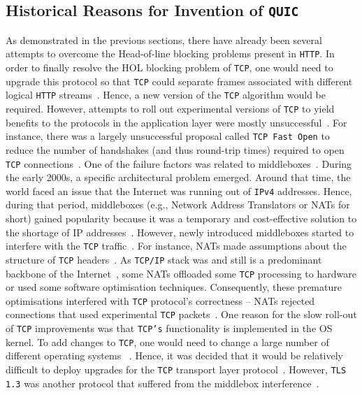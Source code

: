 \documentclass[12pt,a4paper]{report}
\begin{document}
\subsection{Historical Reasons for Invention of \texttt{QUIC}}
As demonstrated in the previous sections, there have already been several attempts to overcome the Head-of-line blocking problems present in \texttt{HTTP}.
In order to finally resolve the HOL blocking problem of \texttt{TCP}, one would need to upgrade this protocol so that \texttt{TCP} could separate frames associated with different logical \texttt{HTTP} streams~\cite{head-of-line-blocking-in-quic-and-http-3-the-details}.
Hence, a new version of the \texttt{TCP} algorithm would be required. 
However, attempts to roll out experimental versions of \texttt{TCP} to yield benefits to the protocols in the application layer were mostly unsuccessful~\cite{bib_Netdev_0x13_QUIC_Tutorial, PollardBarry2019HiAP}.
For instance, there was a largely unsuccessful proposal called \texttt{TCP Fast Open} to reduce the number of handshakes (and thus round-trip times) required to open \texttt{TCP} connections~\cite{the-sad-story-of-tcp-fast-open}.
One of the failure factors was related to middleboxes~\cite{the-sad-story-of-tcp-fast-open}.
During the early 2000s, a specific architectural problem emerged.
Around that time, the world faced an issue that the Internet was running out of \texttt{IPv4} addresses.
Hence, during that period, middleboxes (e.g., Network Address Translators or NATs for short) gained popularity because it was a temporary and cost-effective solution to the shortage of IP addresses~\cite{MurphyNiallRichard2005Ina, bib_Netdev_0x13_QUIC_Tutorial}.
However, newly introduced middleboxes started to interfere with the \texttt{TCP} traffic~\cite{bib_Netdev_0x13_QUIC_Tutorial, PollardBarry2019HiAP}.
For instance, NATs made assumptions about the structure of \texttt{TCP} headers~\cite{bib_Netdev_0x13_QUIC_Tutorial, PollardBarry2019HiAP}.
As \texttt{TCP/IP} stack was and still is a predominant backbone of the Internet~\cite{tcp-ip-stack_shtml}, some NATs offloaded some \texttt{TCP} processing to hardware or used some software optimisation techniques.
Consequently, these premature optimisations interfered with \texttt{TCP} protocol's correctness -- NATs rejected connections that used experimental \texttt{TCP} packets~\cite{PollardBarry2019HiAP}.
One reason for the slow roll-out of \texttt{TCP} improvements was that \texttt{TCP's} functionality is implemented in the OS kernel.
To add changes to \texttt{TCP}, one would need to change a large number of different operating systems ~\cite{PollardBarry2019HiAP}.
Hence, it was decided that it would be relatively difficult to deploy upgrades for the \texttt{TCP} transport layer protocol~\cite{head-of-line-blocking-in-quic-and-http-3-the-details}.
However, \texttt{TLS 1.3} was another protocol that suffered from the middlebox interference~\cite{why-tls-1-3-isnt-in-browsers-yet}.
\end{document}
